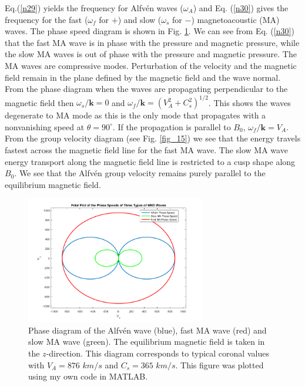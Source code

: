 \documentclass[12pt,a4paper,twoside]{article}
\newcommand{\Alfven}{Alfv\'{e}n }
\begin{document}
Eq.(\ref{n29}) yields the frequency for \Alfven waves ($\omega_A$) and Eq. (\ref{n30}) gives the frequency for the fast ($\omega_f$ for $+$) and slow ($\omega_s$ for $-$) magnetoacoustic (MA) waves. The phase speed diagram is shown in Fig. \ref{fig_9}. We can see from Eq. (\ref{n30}) that the fast MA wave is in phase with the pressure and magnetic pressure, while the slow MA waves is out of phase with the  pressure and magnetic pressure. The MA waves are compressive modes. Perturbation of the velocity and the magnetic field remain in the plane defined by the magnetic field and the wave normal. From the phase diagram when the waves are propagating perpendicular to the magnetic field then $\omega_s / \boldsymbol{k}=0$ and $\omega_f / \boldsymbol{k} = (V_A^2+C_s^2)^{1/2}$. This shows the waves degenerate to MA mode as this is the only mode that propagates with a nonvanishing speed at $\theta=90^{\circ}$. If the propagation is parallel to $B_0$, $\omega_f / \boldsymbol{k}=V_A$. From the group velocity diagram (see Fig. \ref{fig_15}) we see that the energy travels fastest across the magnetic field line for the fast MA wave. The slow MA wave energy transport along the magnetic field line is restricted to a cusp shape along $B_0$. We see that the \Alfven group velocity remains purely parallel to the equilibrium magnetic field.
\begin{figure}[h]
\centering
\includegraphics[width = 0.70\textwidth]{disp_sq}
\caption{Phase diagram of the \Alfven wave (blue), fast MA wave (red) and slow MA wave (green). The equilibrium magnetic field is taken in the $z$-direction. This diagram corresponds to typical coronal values with $V_A=876$ $km/s$ and $C_s = 365$ $km/s$. This figure was plotted using my own code in MATLAB.}\label{fig_9} 
\end{figure}
\end{document}
